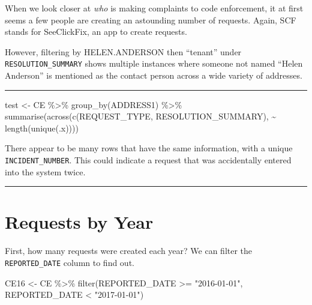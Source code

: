 \documentclass[
]{book}
\newenvironment{Shaded}{\begin{snugshade}}{\end{snugshade}}
\newcommand{\FunctionTok}[1]{\textcolor[rgb]{0.00,0.00,0.00}{#1}}
\newcommand{\NormalTok}[1]{#1}
\newcommand{\OtherTok}[1]{\textcolor[rgb]{0.56,0.35,0.01}{#1}}
\newcommand{\SpecialCharTok}[1]{\textcolor[rgb]{0.00,0.00,0.00}{#1}}
\newcommand{\StringTok}[1]{\textcolor[rgb]{0.31,0.60,0.02}{#1}}
\begin{document}
When we look closer at \emph{who} is making complaints to code enforcement, it at first seems a few people are creating an astounding number of requests. Again, SCF stands for SeeClickFix, an app to create requests.

However, filtering by HELEN.ANDERSON then ``tenant'' under \texttt{RESOLUTION\_SUMMARY} shows multiple instances where someone not named ``Helen Anderson'' is mentioned as the contact person across a wide variety of addresses.

\begin{center}\rule{0.5\linewidth}{0.5pt}\end{center}

\begin{Shaded}
\begin{Highlighting}[]
\NormalTok{test }\OtherTok{\textless{}{-}}\NormalTok{ CE }\SpecialCharTok{\%\textgreater{}\%} 
  \FunctionTok{group\_by}\NormalTok{(ADDRESS1) }\SpecialCharTok{\%\textgreater{}\%} 
  \FunctionTok{summarise}\NormalTok{(}\FunctionTok{across}\NormalTok{(}\FunctionTok{c}\NormalTok{(REQUEST\_TYPE, RESOLUTION\_SUMMARY), }\SpecialCharTok{\textasciitilde{}} \FunctionTok{length}\NormalTok{(}\FunctionTok{unique}\NormalTok{(.x))))}
\end{Highlighting}
\end{Shaded}

There appear to be many rows that have the same information, with a unique \texttt{INCIDENT\_NUMBER}. This could indicate a request that was accidentally entered into the system twice.

\begin{center}\rule{0.5\linewidth}{0.5pt}\end{center}

\hypertarget{requests-by-year}{%
\section{Requests by Year}\label{requests-by-year}}

First, how many requests were created each year? We can filter the \texttt{REPORTED\_DATE} column to find out.

\begin{Shaded}
\begin{Highlighting}[]
\NormalTok{CE16 }\OtherTok{\textless{}{-}}\NormalTok{ CE }\SpecialCharTok{\%\textgreater{}\%} \FunctionTok{filter}\NormalTok{(REPORTED\_DATE }\SpecialCharTok{\textgreater{}=} \StringTok{"2016{-}01{-}01"}\NormalTok{, REPORTED\_DATE }\SpecialCharTok{\textless{}} \StringTok{"2017{-}01{-}01"}\NormalTok{)}
\end{Highlighting}
\end{Shaded}
\end{document}
